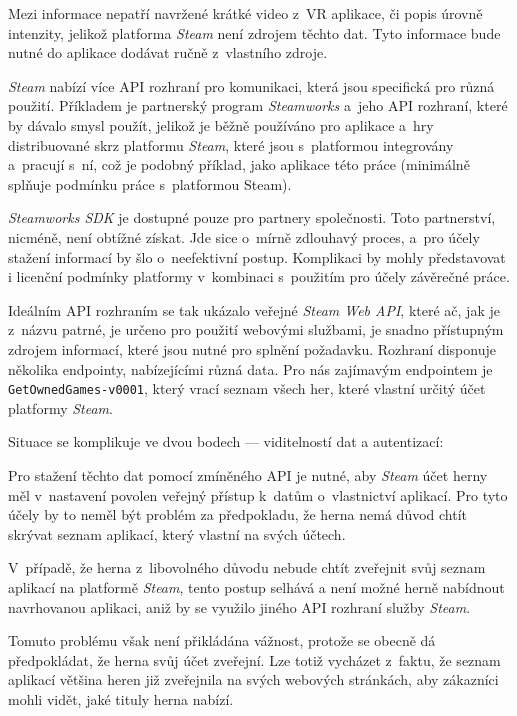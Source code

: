 Mezi informace nepatří navržené krátké video z~VR aplikace, či popis úrovně
intenzity, jelikož platforma \emph{Steam} není zdrojem těchto dat. Tyto
informace bude nutné do aplikace dodávat ručně z~vlastního zdroje.

\emph{Steam} nabízí více API rozhraní pro komunikaci, která jsou specifická pro různá
použití. Příkladem je partnerský program \emph{Steamworks} a~jeho API rozhraní, 
které by dávalo smysl použít, jelikož je
běžně používáno pro aplikace a~hry distribuované skrz platformu \emph{Steam},
které jsou s~platformou integrovány a~pracují s~ní, což je podobný příklad, jako aplikace této práce (minimálně splňuje podmínku práce
s~platformou Steam). \autocite{steamworks}

\emph{Steamworks SDK} je dostupné pouze pro
partnery společnosti. Toto partnerství, nicméně, není obtížné získat.
Jde sice o~mírně zdlouhavý proces, a~pro účely stažení informací by šlo
o~neefektivní postup. Komplikaci by mohly představovat i licenční podmínky
platformy v~kombinaci s~použitím pro účely závěrečné práce.

Ideálním API rozhraním se tak ukázalo veřejné \emph{Steam Web API},
které ač, jak je z~názvu patrné, je určeno pro použití webovými
službami, je snadno přístupným zdrojem informací, které jsou
nutné pro splnění požadavku. \autocite{steamwebapi} Rozhraní disponuje několika endpointy,
nabízejícími různá data. Pro nás zajímavým endpointem je
\texttt{GetOwnedGames-v0001}, který vrací seznam všech her, které
vlastní určitý účet platformy \emph{Steam}.

Situace se komplikuje ve dvou bodech --- viditelností dat a
autentizací:

Pro stažení těchto dat pomocí zmíněného API je nutné, aby \emph{Steam} 
účet herny měl v~nastavení povolen veřejný přístup
k~datům o~vlastnictví aplikací. Pro tyto účely by to neměl být problém za
předpokladu, že herna nemá důvod chtít skrývat seznam aplikací, který vlastní
na svých účtech. 

V~případě, že herna z~libovolného důvodu nebude chtít
zveřejnit svůj seznam aplikací na platformě \emph{Steam}, tento postup  selhává a
není možné herně nabídnout navrhovanou aplikaci, aniž by se využilo
jiného API rozhraní služby \emph{Steam}. 

Tomuto problému však není přikládána
vážnost, protože se obecně dá předpokládat, že herna svůj účet zveřejní.
Lze totiž vycházet z~faktu, že seznam aplikací většina heren již zveřejnila
na svých webových stránkách, aby zákazníci mohli vidět, jaké tituly
herna nabízí.

